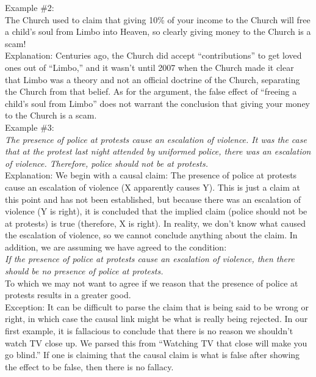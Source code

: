 \documentclass[a4paper,12pt,single,pdftex]{scrbook}
\begin{document}
    
      Example \#2:
    \\

    
      The Church used to claim that giving 10\% of your income to the Church will free a child’s soul from Limbo into Heaven, so clearly giving money to the Church is a scam!
    \\

    
      Explanation: Centuries ago, the Church did accept “contributions” to get loved ones out of “Limbo,” and it wasn’t until 2007 when the Church made it clear that Limbo was a theory and not an official doctrine of the Church, separating the Church from that belief. As for the argument, the false effect of “freeing a child’s soul from Limbo” does not warrant the conclusion that giving your money to the Church is a scam.
    \\

    
      Example \#3: 
    \\

    
      {\em The presence of police at protests cause an escalation of violence. It was the case that at the protest last night attended by uniformed police, there was an escalation of violence. Therefore, police should not be at protests.}
    \\

    
      Explanation: We begin with a causal claim: The presence of police at protests cause an escalation of violence (X apparently causes Y). This is just a claim at this point and has not been established, but because there was an escalation of violence (Y is right), it is concluded that the implied claim (police should not be at protests) is true (therefore, X is right). In reality, we don’t know what caused the escalation of violence, so we cannot conclude anything about the claim. In addition, we are assuming we have agreed to the condition:
    \\

    
      {\em If the presence of police at protests cause an escalation of violence, then there should be no presence of police at protests.}
    \\

    
      To which we may not want to agree if we reason that the presence of police at protests results in a greater good.
    \\

    
      Exception: It can be difficult to parse the claim that is being said to be wrong or right, in which case the causal link might be what is really being rejected. In our first example, it is fallacious to conclude that there is no reason we shouldn’t watch TV close up. We parsed this from “Watching TV that close will make you go blind.” If one is claiming that the causal claim is what is false after showing the effect to be false, then there is no fallacy.
    \\
\end{document}
